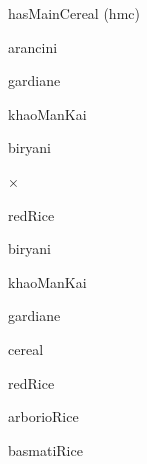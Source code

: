 \documentclass[a4paper,portrait,12pt]{article}
\begin{document}
\begin{flushleft}
hasMainCereal (hmc)
\end{flushleft}


\begin{flushleft}
arancini
\end{flushleft}


\begin{flushleft}
gardiane
\end{flushleft}


\begin{flushleft}
khaoManKai
\end{flushleft}


\begin{flushleft}
biryani
\end{flushleft}





×





\begin{flushleft}
redRice
\end{flushleft}





\begin{flushleft}
biryani
\end{flushleft}





\begin{flushleft}
khaoManKai
\end{flushleft}





\begin{flushleft}
gardiane
\end{flushleft}





\begin{flushleft}
cereal
\end{flushleft}


\begin{flushleft}
redRice
\end{flushleft}


\begin{flushleft}
arborioRice
\end{flushleft}


\begin{flushleft}
basmatiRice
\end{flushleft}
\end{document}
